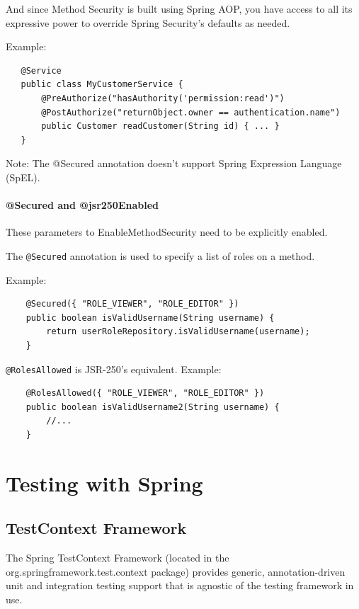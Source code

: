 \documentclass{scrartcl}
\begin{document}
And since Method Security is built using Spring AOP, you have access to all its expressive power to override Spring Security’s defaults as needed.

Example:

\begin{lstlisting}
   @Service
   public class MyCustomerService {
       @PreAuthorize("hasAuthority('permission:read')")
       @PostAuthorize("returnObject.owner == authentication.name")
       public Customer readCustomer(String id) { ... }
   }
\end{lstlisting}

Note: The @Secured annotation doesn’t support Spring Expression Language (SpEL).

\paragraph{@Secured and @jsr250Enabled}

These parameters to EnableMethodSecurity need to be explicitly enabled.

The \lstinline|@Secured| annotation is used to specify a list of roles on a method.

Example:

\begin{lstlisting}
    @Secured({ "ROLE_VIEWER", "ROLE_EDITOR" })
    public boolean isValidUsername(String username) {
        return userRoleRepository.isValidUsername(username);
    }

\end{lstlisting}

\lstinline|@RolesAllowed| is JSR-250’s equivalent. Example:

\begin{lstlisting}
    @RolesAllowed({ "ROLE_VIEWER", "ROLE_EDITOR" })
    public boolean isValidUsername2(String username) {
        //...
    }
\end{lstlisting}

\section{Testing with Spring}

\subsection{TestContext Framework}

The Spring TestContext Framework (located in the org.springframework.test.context package) provides generic, annotation-driven unit and integration testing support that is agnostic of the testing framework in use.
\end{document}
